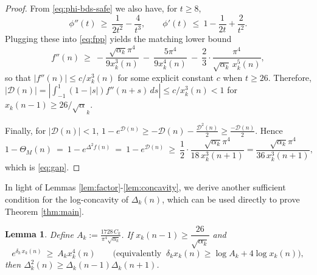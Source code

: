 \documentclass[12pt]{article}
\newtheorem{lem}[thm]{Lemma}
\numberwithin{equation}{section}
\begin{document}
\begin{proof}
From \eqref{eq:phi-bds-safe} we also have, for $t\ge8$,
\[
\phi''(t)\ \ge\ \frac{1}{2t^2}-\frac{4}{t^3},\qquad
\phi'(t)\ \le\ 1-\frac{1}{2t}+\frac{2}{t^2}.
\]
Plugging these into \eqref{eq:fpp} yields the matching lower bound
\[
f''(n)\ \ge\ -\frac{\sqrt{\alpha_k}\pi^4}{9x_k^3(n)}\ -\ \frac{5\pi^4}{9x_k^4(n)}\ -\ \frac{2}{3}\cdot\frac{\pi^4}{\sqrt{\alpha_k}\,x_k^5(n)},
\]
so that $|f''(n)|\le c/x_k^3(n)$ for some explicit constant $c$ when $t\ge 26$. Therefore,
\(
|\mathcal{D}(n)|
=\left|\int_{-1}^{1}(1-|s|)f''(n+s)\,ds\right|
\le c/x_k^3(n)<1
\)
for $x_k(n-1)\ge 26/\sqrt\alpha_k$.

Finally, for $|\mathcal{D}(n)|<1$,
\(
1-e^{\mathcal{D}(n)}\ge -\mathcal{D}(n)-\tfrac{\mathcal{D}^2(n)}{2}\ge \tfrac{-\mathcal{D}(n)}{2}.
\)
Hence
\[
1-\Theta_M(n)\ =\ 1-e^{\Delta^2 f(n)}\ =\ 1-e^{\mathcal{D}(n)}\ \ge\ \frac{1}{2}\cdot\frac{\sqrt{\alpha_k}\pi^4}{18\,x_k^3(n+1)}
=\frac{\sqrt{\alpha_k}\pi^4}{36\,x_k^3(n+1)},
\]
which is \eqref{eq:gap}.
\end{proof}


In light of Lemmas \ref{lem:factor}-\ref{lem:concavity}, we derive another sufficient condition for the log-concavity of $\Delta_k(n)$, which can be used directly to prove Theorem \ref{thm:main}.
\begin{lem}\label{lem:analytic}
Define
$A_k:=\frac{1728\,C_k}{\pi^4\sqrt{\alpha_k}}$.
If $x_k(n-1)\ge \dfrac{26}{\sqrt{\alpha_k}}$ and
\begin{equation}\label{eq:key-ineq}
e^{\delta_k\,x_k(n)}\ \ge\ A_k x_k^4(n)
\qquad\big(\text{equivalently }~ \delta_k x_k(n)\ge \log A_k+ 4\log x_k(n)\big),
\end{equation}
then $\Delta_k^2(n)\ge \Delta_k(n-1)\Delta_k(n+1)$.
\end{lem}
\end{document}
